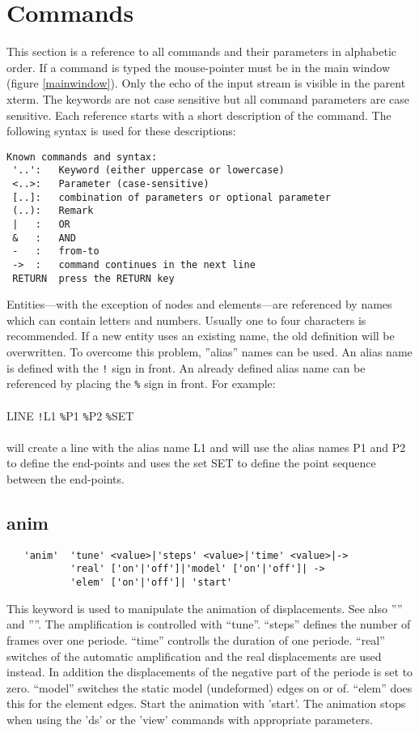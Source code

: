 \documentclass{article}
\begin{document}
\section{\label{Commands}Commands}
This section is a reference to all commands and their parameters in alphabetic order. If a command is typed the mouse-pointer must be in the main window (figure \ref{mainwindow}). Only the echo of the input stream is visible in the parent xterm. The keywords are not case sensitive but all command parameters are case sensitive. Each reference starts with a short description of the command. The following syntax is used for these descriptions:
\begin{verbatim}
Known commands and syntax:
 '..':   Keyword (either uppercase or lowercase)
 <..>:   Parameter (case-sensitive)
 [..]:   combination of parameters or optional parameter
 (..):   Remark
 |   :   OR
 &   :   AND
 -   :   from-to
 ->  :   command continues in the next line
 RETURN  press the RETURN key 
\end{verbatim}
Entities---with the exception of nodes and elements---are referenced by names which can contain letters and numbers. Usually one to four characters is recommended. If a new entity uses an existing name, the old definition will be overwritten. To overcome this problem, ''alias'' names can be used. An alias name is defined with the \verb_!_ sign in front. An already defined alias name can be referenced by placing the \verb_%_ sign in front. For example:\\\\
LINE \verb_!_L1 \verb_%_P1 \verb_%_P2 \verb_%_SET\\\\will create a line with the alias name L1 and will use the alias names P1 and P2 to define the end-points and uses the set SET to define the point sequence between the end-points. 

\subsection{\label{anim}anim}
\begin{verbatim}
   'anim'  'tune' <value>|'steps' <value>|'time' <value>|->
           'real' ['on'|'off']|'model' ['on'|'off']| ->
           'elem' ['on'|'off']| 'start'
\end{verbatim}
This keyword is used to manipulate the animation of displacements. See also '''' and ''''. The amplification is controlled with ``tune''. ``steps'' defines the number of frames over one periode. ``time'' controlls the duration of one periode. ``real'' switches of the automatic amplification and the real displacements are used instead. In addition the displacements of the negative part of the periode is set to zero. ``model'' switches the static model (undeformed) edges on or of. ``elem'' does this for the element edges. Start the animation with 'start'. The animation stops when using the 'ds' or the 'view' commands with appropriate parameters.
\end{document}
